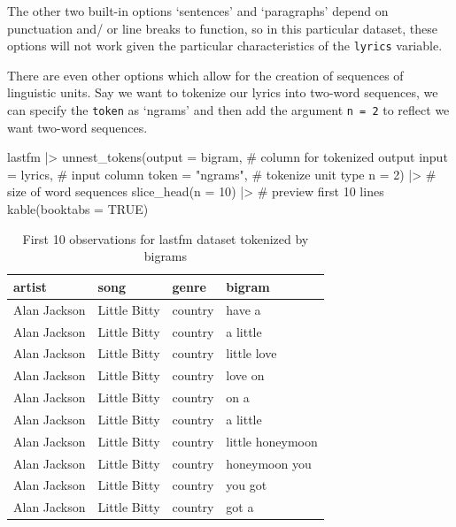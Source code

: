 \documentclass[
  letterpaper,
]{latex/krantz}
\newenvironment{Shaded}{\begin{snugshade}}{\end{snugshade}}
\newcommand{\AttributeTok}[1]{\textcolor[rgb]{0.40,0.45,0.13}{#1}}
\newcommand{\CommentTok}[1]{\textcolor[rgb]{0.37,0.37,0.37}{#1}}
\newcommand{\ConstantTok}[1]{\textcolor[rgb]{0.56,0.35,0.01}{#1}}
\newcommand{\DecValTok}[1]{\textcolor[rgb]{0.68,0.00,0.00}{#1}}
\newcommand{\FunctionTok}[1]{\textcolor[rgb]{0.28,0.35,0.67}{#1}}
\newcommand{\NormalTok}[1]{\textcolor[rgb]{0.00,0.23,0.31}{#1}}
\newcommand{\SpecialCharTok}[1]{\textcolor[rgb]{0.37,0.37,0.37}{#1}}
\newcommand{\StringTok}[1]{\textcolor[rgb]{0.13,0.47,0.30}{#1}}
\begin{document}
The other two built-in options `sentences' and `paragraphs' depend on
punctuation and/ or line breaks to function, so in this particular
dataset, these options will not work given the particular
characteristics of the \texttt{lyrics} variable.

There are even other options which allow for the creation of sequences
of linguistic units. Say we want to tokenize our lyrics into two-word
sequences, we can specify the \texttt{token} as `ngrams' and then add
the argument \texttt{n\ =\ 2} to reflect we want two-word sequences.

\begin{Shaded}
\begin{Highlighting}[]
\NormalTok{lastfm }\SpecialCharTok{|\textgreater{}} 
  \FunctionTok{unnest\_tokens}\NormalTok{(}\AttributeTok{output =}\NormalTok{ bigram, }\CommentTok{\# column for tokenized output}
                \AttributeTok{input =}\NormalTok{ lyrics, }\CommentTok{\# input column}
                \AttributeTok{token =} \StringTok{"ngrams"}\NormalTok{, }\CommentTok{\# tokenize unit type}
                \AttributeTok{n =} \DecValTok{2}\NormalTok{) }\SpecialCharTok{|\textgreater{}}  \CommentTok{\# size of word sequences }
  \FunctionTok{slice\_head}\NormalTok{(}\AttributeTok{n =} \DecValTok{10}\NormalTok{) }\SpecialCharTok{|\textgreater{}}  \CommentTok{\# preview first 10 lines}
  \FunctionTok{kable}\NormalTok{(}\AttributeTok{booktabs =} \ConstantTok{TRUE}\NormalTok{)}
\end{Highlighting}
\end{Shaded}

\hypertarget{tbl-td-lastfm-tokenize-bigrams}{}
\begin{table}
\caption{\label{tbl-td-lastfm-tokenize-bigrams}First 10 observations for lastfm dataset tokenized by bigrams }\tabularnewline

\centering
\begin{tabular}{llll}
\toprule
artist & song & genre & bigram\\
\midrule
Alan Jackson & Little Bitty & country & have a\\
Alan Jackson & Little Bitty & country & a little\\
Alan Jackson & Little Bitty & country & little love\\
Alan Jackson & Little Bitty & country & love on\\
Alan Jackson & Little Bitty & country & on a\\
\addlinespace
Alan Jackson & Little Bitty & country & a little\\
Alan Jackson & Little Bitty & country & little honeymoon\\
Alan Jackson & Little Bitty & country & honeymoon you\\
Alan Jackson & Little Bitty & country & you got\\
Alan Jackson & Little Bitty & country & got a\\
\bottomrule
\end{tabular}
\end{table}
\end{document}
